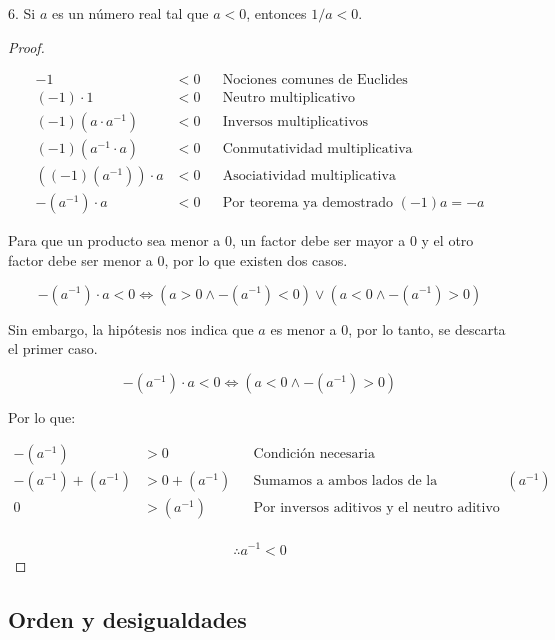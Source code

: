 \documentclass{article}
\begin{document}
6. Si \(a\) es un número real tal que \(a<0\), entonces \(1/a < 0\). \\
\begin{proof}

\begin{center}

\begin{align*}
-1 &< 0 && \text{Nociones comunes de Euclides} \\ 
(-1) \cdot 1 &< 0 && \text{Neutro multiplicativo} \\
(-1)(a \cdot a^{-1}) &< 0 && \text{Inversos multiplicativos} \\
(-1)(a^{-1} \cdot a) &< 0 && \text{Conmutatividad multiplicativa} \\
((-1)(a^{-1})) \cdot a &< 0 && \text{Asociatividad multiplicativa} \\
-(a^{-1}) \cdot a &< 0 && \text{Por teorema ya demostrado $(-1)a=-a$}
\end{align*}
\end{center}

Para que un producto sea menor a 0, un factor debe ser mayor a 0 y el otro factor debe ser menor a 0, por lo que existen dos casos.

\[ -(a^{-1}) \cdot a < 0 \iff (a > 0 \land -(a^{-1}) < 0) \lor (a < 0 \land -(a^{-1}) > 0) \]

Sin embargo, la hipótesis nos indica que \(a\) es menor a 0, por lo tanto, se descarta el primer caso.

\[ -(a^{-1}) \cdot a < 0 \iff (a < 0 \land -(a^{-1}) > 0) \]

Por lo que:
\begin{center}
\begin{align*}
-(a^{-1}) &> 0 && \text{Condición necesaria} \\ 
-(a^{-1})+(a^{-1}) &> 0+(a^{-1}) && \text{Sumamos a ambos lados de la desigualdad \((a^{-1})\)} \\
0 &> (a^{-1}) && \text{Por inversos aditivos y el neutro aditivo} \\
\end{align*}
\end{center}
\[ \therefore a^{-1} < 0 \]
\end{proof}

\subsection*{Orden y desigualdades}
\end{document}

